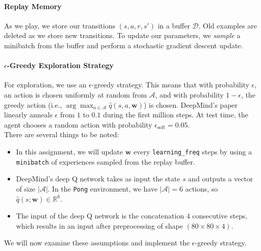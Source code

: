 \documentclass{article}
\begin{document}
\paragraph{Replay Memory}
As we play, we store our transitions $ (s, a, r, s') $ in a buffer $\mathcal{D}$. Old examples are deleted as we store new transitions. To update our parameters, we \emph{sample} a minibatch from the buffer and perform a stochastic gradient descent update.

\paragraph{$\epsilon$-Greedy Exploration Strategy}
For exploration, we use an $\epsilon$-greedy strategy.
This means that with probability $\epsilon$, an action is chosen uniformly at random from $\mathcal{A}$, and with probability $1-\epsilon$, the greedy action (i.e., $\arg\max_{a \in \mathcal{A}} \hat{q}(s,a,\mathbf{w})$) is chosen. DeepMind's paper \cite{mnih2015human} \cite{mnih-atari-2013} linearly anneals $ \epsilon $ from $1$ to $0.1$ during the first million steps. At test time, the agent chooses a random action with probability $\epsilon_{\text{soft}} = 0.05$.\\

There are several things to be noted:
\begin{itemize}
\item In this assignment, we will update $\mathbf{w}$ every \texttt{learning\_freq} steps by using a \texttt{minibatch} of experiences sampled from the replay buffer.

\item DeepMind's deep Q network takes as input the state $s$ and outputs a vector of size $|\mathcal{A}|$. In the \texttt{Pong} environment, we have $|\mathcal{A}| = 6$ actions, so $\hat{q}(s; \mathbf{w}) \in \mathbb{R}^{6}$.

\item The input of the deep Q network is the concatenation $4$ consecutive steps, which results in an input after preprocessing of shape $(80 \times 80 \times 4)$.
\end{itemize}

We will now examine these assumptions and implement the $\epsilon$-greedy strategy.
\end{document}
